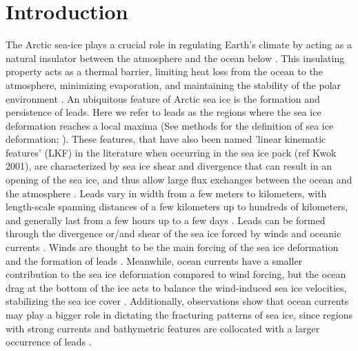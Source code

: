 \documentclass[lineno,sn-basic]{sn-jnl}%
\begin{document}



\maketitle

\section{Introduction}\label{sec1}

The Arctic sea-ice plays a crucial role in regulating Earth's climate by acting as a natural insulator between the atmosphere and the ocean below \citep{Wettlaufer_insulator_1997, Untersteiner_ice_insulator_1961}. This insulating property acts as a thermal barrier, limiting heat loss from the ocean to the atmosphere, minimizing evaporation, and maintaining the stability of the polar environment \citep{Ruffieux_pack_lead_1995}. An ubiquitous feature of Arctic sea ice is the formation and persistence of leads. Here we refer to leads as the regions where the sea ice deformation reaches a local maxima (See methods for the definition of sea ice deformation; \citealt{Hutter_identification_2019}). These features, that have also been named 'linear kinematic features' (LKF) in the literature when  occurring in the sea ice pack (ref Kwok 2001), are characterized by sea ice shear and divergence that can result in an opening of the sea ice, and thus allow large flux exchanges between the ocean and the atmosphere \citep{Lupkes_leads_2008}. Leads vary in width from a few meters to kilometers, with length-scale spanning distances of a few kilometers up to hundreds of kilometers, and generally last from a few hours up to a few days \citep{Linow_lkf_2017, Wernecke_Lead_2015, Tschudi_obs_leads_1998}. Leads can be formed through the divergence or/and shear of the sea ice forced by winds and oceanic currents \citep{Rampal_nextsim_2016, Hutchings_model_lkf_2005, Richter_pack_stress_2002}. Winds are thought to be the main forcing of the sea ice deformation and the formation of leads \citep{Linow_lkf_2017, Hutter_scaling_lkf_2018}. Meanwhile, ocean currents have a smaller contribution to the sea ice deformation compared to wind forcing, but the ocean drag at the bottom of the ice acts to balance the wind-induced sea ice velocities, stabilizing the sea ice cover \citep{Weiss_scale_2004}. Additionally, observations show that ocean currents may play a bigger role in dictating the fracturing patterns of sea ice, since regions with strong currents and bathymetric features are collocated with a larger occurrence of leads \citep{Willmes_leads_currents_2023}.
\end{document}
